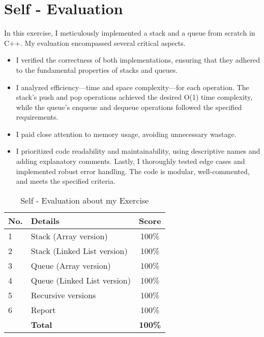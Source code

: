 \section{Self - Evaluation}
In this exercise, I meticulously implemented a stack and a queue from scratch in C++. My evaluation encompassed several critical aspects. 
\begin{itemize}
    \item I verified the correctness of both implementations, ensuring that they adhered to the fundamental properties of stacks and queues.
    \item I analyzed efficiency—time and space complexity—for each operation. The stack’s push and pop operations achieved the desired O(1) time complexity, while the queue’s enqueue and dequeue operations followed the specified requirements.
    \item I paid close attention to memory usage, avoiding unnecessary wastage.
    \item I prioritized code readability and maintainability, using descriptive names and adding explanatory comments. Lastly, I thoroughly tested edge cases and implemented robust error handling. The code is modular, well-commented, and meets the specified criteria.
\end{itemize}
\begin{center}
\begin{table}[H]
    \centering
    \caption{Self - Evaluation about my Exercise}
    \renewcommand{\arraystretch}{1.4}
    \begin{tabular}{|l|p{}|c|}
    \hline
    \textbf{No.} & \textbf{Details}            & \textbf{Score} \\ \hline
    1            & Stack (Array version)       & 100\%          \\ \hline
    2            & Stack (Linked List version) & 100\%          \\ \hline
    3            & Queue (Array version)       & 100\%          \\ \hline
    4            & Queue (Linked List version) & 100\%          \\ \hline
    5            & Recursive versions          & 100\%          \\ \hline
    6            & Report                      & 100\%          \\ \hline
                & \textbf{Total}               &\textbf{100\%}           \\ \hline
  \end{tabular}
    \label{tab:mytable}
\end{table}
  
\end{center}

